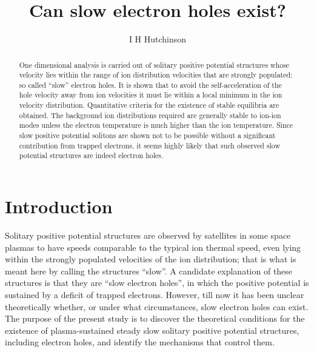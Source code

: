 \documentclass[12pt]{article}
\title{Can slow electron holes exist?}
\author{I H Hutchinson}
\begin{document}
\maketitle
\begin{abstract}
  One dimensional analysis is carried out of solitary positive
  potential structures whose velocity lies within the range of ion
  distribution velocities that are strongly populated: so called
  ``slow'' electron holes. It is shown that to avoid the
  self-acceleration of the hole velocity away from ion velocities it
  must lie within a local minimum in the ion velocity distribution.
  Quantitative criteria for the existence of stable equilibria are
  obtained. The background ion distributions required are generally
  stable to ion-ion modes unless the electron temperature is much
  higher than the ion temperature. Since slow positive potential
  solitons are shown not to be possible without a significant
  contribution from trapped electrons, it seems highly likely that
  such observed slow potential structures are indeed electron holes.
\end{abstract}

\section{Introduction}

Solitary positive potential structures are observed by satellites in
some space plasmas to have speeds comparable to the typical ion
thermal speed, even lying within the strongly populated velocities of
the ion distribution\cite{Graham2016,Steinvall2019,Lotekar2020}; that
is what is meant here by calling the structures ``slow''. A candidate
explanation of these structures is that they are ``slow electron
holes'', in which the positive potential is sustained by a deficit of
trapped electrons. However, till now it has been unclear theoretically
whether, or under what circumstances, slow electron holes can
exist. The purpose of the present study is to discover the theoretical
conditions for the existence of plasma-sustained steady slow solitary
positive potential structures, including electron holes, and identify
the mechanisms that control them.
\end{document}
